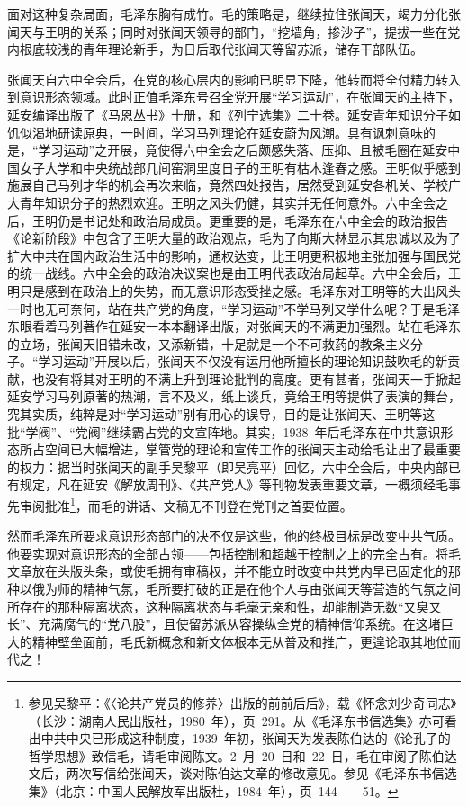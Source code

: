面对这种复杂局面，毛泽东胸有成竹。毛的策略是，继续拉住张闻天，竭力分化张闻天与王明的关系；同时对张闻天领导的部门，“挖墙角，掺沙子”，提拔一些在党内根底较浅的青年理论新手，为日后取代张闻天等留苏派，储存干部队伍。

张闻天自六中全会后，在党的核心层内的影响已明显下降，他转而将全付精力转入到意识形态领域。此时正值毛泽东号召全党开展“学习运动”，在张闻天的主持下，延安编译出版了《马恩丛书》十册，和《列宁选集》二十卷。延安青年知识分子如饥似渴地研读原典，一时间，学习马列理论在延安蔚为风潮。具有讽刺意味的是，“学习运动”之开展，竟使得六中全会之后颇感失落、压抑、且被毛圈在延安中国女子大学和中央统战部几间窑洞里度日子的王明有枯木逢春之感。王明似乎感到施展自己马列才华的机会再次来临，竟然四处报告，居然受到延安各机关、学校广大青年知识分子的热烈欢迎。王明之风头仍健，其实并无任何意外。六中全会之后，王明仍是书记处和政治局成员。更重要的是，毛泽东在六中全会的政治报告《论新阶段》中包含了王明大量的政治观点，毛为了向斯大林显示其忠诚以及为了扩大中共在国内政治生活中的影响，通权达变，比王明更积极地主张加强与国民党的统一战线。六中全会的政治决议案也是由王明代表政治局起草。六中全会后，王明只是感到在政治上的失势，而无意识形态受挫之感。毛泽东对王明等的大出风头一时也无可奈何，站在共产党的角度，“学习运动”不学马列又学什么呢？于是毛泽东眼看着马列著作在延安一本本翻译出版，对张闻天的不满更加强烈。站在毛泽东的立场，张闻天旧错未改，又添新错，十足就是一个不可救药的教条主义分子。“学习运动”开展以后，张闻天不仅没有运用他所擅长的理论知识鼓吹毛的新贡献，也没有将其对王明的不满上升到理论批判的高度。更有甚者，张闻天一手掀起延安学习马列原著的热潮，言不及义，纸上谈兵，竟给王明等提供了表演的舞台，究其实质，纯粹是对“学习运动”别有用心的误导，目的是让张闻天、王明等这批“学阀”、“党阀”继续霸占党的文宣阵地。其实，1938~年后毛泽东在中共意识形态所占空间已大幅增进，掌管党的理论和宣传工作的张闻天主动给毛让出了最重要的权力：据当时张闻天的副手吴黎平（即吴亮平）回忆，六中全会后，中央内部已有规定，凡在延安《解放周刊》、《共产党人》等刊物发表重要文章，一概须经毛事先审阅批准\footnote{参见吴黎平：《〈论共产党员的修养〉出版的前前后后》，载《怀念刘少奇同志》（长沙：湖南人民出版社，1980~年），页~291。从《毛泽东书信选集》亦可看出中共中央已形成这种制度，1939~年初，张闻天为发表陈伯达的《论孔子的哲学思想》致信毛，请毛审阅陈文。2~月~20~日和~22~日，毛在审阅了陈伯达文后，两次写信给张闻天，谈对陈伯达文章的修改意见。参见《毛泽东书信选集》（北京：中国人民解放军出版杜，1984~年），页~144~—~51。}，而毛的讲话、文稿无不刊登在党刊之首要位置。

然而毛泽东所要求意识形态部门的决不仅是这些，他的终极目标是改变中共气质。他要实现对意识形态的全部占领——包括控制和超越于控制之上的完全占有。将毛文章放在头版头条，或使毛拥有审稿权，并不能立时改变中共党内早已固定化的那种以俄为师的精神气氛，毛所要打破的正是在他个人与由张闻天等营造的气氛之间所存在的那种隔离状态，这种隔离状态与毛毫无亲和性，却能制造无数“又臭又长”、充满腐气的“党八股”，且使留苏派从容操纵全党的精神信仰系统。在这堵巨大的精神壁垒面前，毛氏新概念和新文体根本无从普及和推广，更遑论取其地位而代之！

